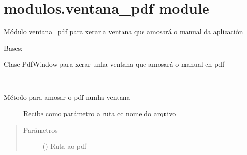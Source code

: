 \documentclass[letterpaper,10pt,spanish]{sphinxmanual}
\begin{document}
\section{modulos.ventana\_pdf module}
\label{\detokenize{api/modulos:module-modulos.ventana_pdf}}\label{\detokenize{api/modulos:modulos-ventana-pdf-module}}
\sphinxAtStartPar
Módulo ventana\_pdf
para xerar a ventana que amosará o manual da aplicación

\begin{fulllineitems}
\label{\detokenize{api/modulos:modulos.ventana_pdf.PdfWindow}}
\sphinxAtStartPar
Bases: 

\sphinxAtStartPar
Clase PdfWindow para xerar unha ventana que amosará o manual en pdf

\begin{fulllineitems}
\label{\detokenize{api/modulos:modulos.ventana_pdf.PdfWindow.showPdf}}~\begin{description}
\item[{Método para amosar o pdf nunha ventana}] \leavevmode
\sphinxAtStartPar
Recibe como parámetro a ruta co nome do arquivo

\end{description}
\begin{quote}\begin{description}
\item[{Parámetros}] \leavevmode
\sphinxAtStartPar
{} () \textendash{} Ruta ao pdf

\end{description}\end{quote}


\end{fulllineitems}
\end{fulllineitems}
\end{document}

